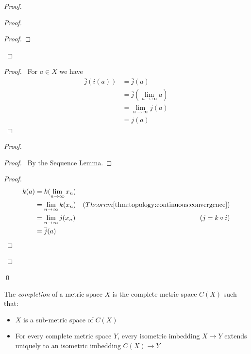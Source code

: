 \begin{proof}
\begin{proof}
\begin{proof}
    \end{proof}
  \end{proof}
  \begin{proof}
    \pf\ For $a \in X$ we have
    \begin{align*}
      \overline{j}(i(a)) & = \overline{j}(a) \\
      & = \overline{j}(\lim_{n \rightarrow \infty} a) \\
      & = \lim_{n \rightarrow \infty} j(a) \\
      & = j(a)
    \end{align*}
  \end{proof}
  \begin{proof}
    \begin{proof}
      \pf\ By the Sequence Lemma.
    \end{proof}
    \begin{proof}
      \pf
      \begin{align*}
        k(a) & = k(\lim_{n \rightarrow \infty} x_n) \\
        & = \lim_{n \rightarrow \infty} k(x_n) & (Theorem \ref{thm:topology:continuous:convergence})\\
        & = \lim_{n \rightarrow \infty} j(x_n) & (j = k \circ i) \\
        & = \overline{j}(a)
      \end{align*}
    \end{proof}
  \end{proof}
  \qed
\end{proof}

\begin{df}[Completion]
  The \emph{completion} of a metric space $X$ is the complete metric space $C(X)$ such that:
  \begin{itemize}
    \item
    $X$ is a sub-metric space of $C(X)$
    \item
    For every complete metric space $Y$, every isometric imbedding $X \rightarrow Y$ extends uniquely to an isometric imbedding $C(X) \rightarrow Y$
  \end{itemize}
\end{df}

